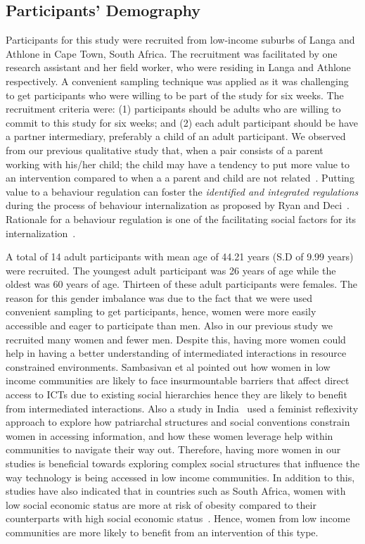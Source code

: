 \documentclass{sig-alternate}
\begin{document}
\subsection{Participants' Demography}
Participants for this study were recruited from low-income suburbs of Langa and Athlone in Cape Town, South Africa. The recruitment was facilitated by one research assistant and her field worker, who were residing in Langa and Athlone respectively. A convenient sampling technique was applied as it was challenging to get participants who were willing to be part of the study for six weeks.  The recruitment criteria were: (1) participants should be adults who are willing to commit to this study for six weeks; and (2) each adult participant should be have a partner intermediary, preferably a child of an adult participant. We observed from our previous qualitative study that, when a pair consists of a parent working with his/her child; the child may have a tendency to put more value to an intervention compared to when a a parent and child are not related~\cite{katule2016:leveraging}. Putting value to a behaviour regulation can foster the \emph{identified and integrated regulations} during the process of behaviour internalization as proposed by Ryan and Deci~\cite{ryan2000intrinsic}. Rationale for a behaviour regulation is one of the facilitating social factors for  its internalization~\cite{deci1994facilitating}. 

A total of 14 adult participants with mean age of 44.21 years (S.D of 9.99 years) were recruited.  The youngest adult participant was 26 years of age while the oldest was 60 years of age. Thirteen of these adult participants were females. The reason for this gender imbalance was due to the fact that we were used convenient sampling to get participants, hence, women were more easily accessible and eager to participate than men.  Also in our previous study\cite{katule2016:leveraging} we recruited many women and fewer men. Despite this, having more women could help in having a better understanding of intermediated interactions in resource constrained environments. Sambasivan et al\cite{sambasivan2010} pointed out how women in low income communities are likely to face insurmountable barriers that affect direct access to ICTs due to existing social hierarchies hence they are likely to benefit from intermediated interactions. Also a study in India~\cite{kumar2015mobile} used a feminist reflexivity approach to explore how patriarchal structures and social conventions constrain women in accessing information, and how these women leverage help within communities to navigate their way out. Therefore, having more women in our studies is beneficial towards exploring complex social structures that influence the way technology is being accessed in low income communities. In addition to this, studies have also indicated  that in countries such as South Africa, women with low social economic status are more at risk of obesity compared to their counterparts with high social economic status~\cite{katule2016:leveraging}. Hence, women from  low income communities are more likely to benefit from an intervention of this type.  
\end{document}
